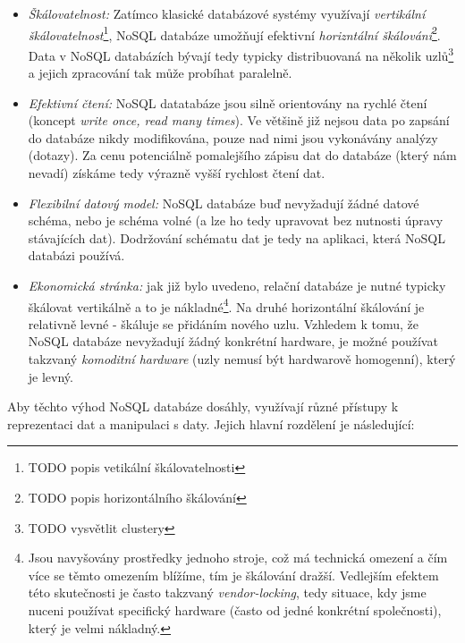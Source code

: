 \begin{itemize}
  \item{\textit{Škálovatelnost:}} Zatímco klasické databázové systémy využívají \textit{vertikální škálovatelnost}\footnote{TODO popis vetikální škálovatelnosti}, NoSQL databáze umožňují efektivní \textit{horizntální škálování}\footnote{TODO popis horizontálního škálování}. Data v NoSQL databázích bývají tedy typicky distribuovaná na několik uzlů\footnote{TODO vysvětlit clustery} a jejich zpracování tak může probíhat paralelně. 
  \item{\textit{Efektivní čtení:}} NoSQL datatabáze jsou silně orientovány na rychlé čtení (koncept \textit{write once, read many times}). Ve většině již nejsou data po zapsání do databáze nikdy modifikována, pouze nad nimi jsou vykonávány analýzy (dotazy). Za cenu potenciálně pomalejšího zápisu dat do databáze (který nám nevadí) získáme tedy výrazně vyšší rychlost čtení dat.  
  \item{\textit{Flexibilní datový model:}} NoSQL databáze buď nevyžadují žádné datové schéma, nebo je schéma volné (a lze ho tedy upravovat bez nutnosti úpravy stávajících dat). Dodržování schématu dat je tedy na aplikaci, která NoSQL databázi používá.  
  \item{\textit{Ekonomická stránka:}} jak již bylo uvedeno, relační databáze je nutné typicky škálovat vertikálně a to je nákladné\footnote{Jsou navyšovány prostředky jednoho stroje, což má technická omezení a čím více se těmto omezením blížíme, tím je škálování dražší. Vedlejším efektem této skutečnosti je často takzvaný \textit{vendor-locking}, tedy situace, kdy jsme nuceni používat specifický hardware (často od jedné konkrétní společnosti), který je velmi nákladný.}. Na druhé horizontální škálování je relativně levné - škáluje se přidáním nového uzlu. Vzhledem k tomu, že NoSQL databáze nevyžadují žádný konkrétní hardware, je možné používat takzvaný \textit{komoditní hardware} (uzly nemusí být hardwarově homogenní), který je levný.  
\end{itemize}

Aby těchto výhod NoSQL databáze dosáhly, využívají různé přístupy k reprezentaci dat a manipulaci s daty. Jejich hlavní rozdělení je následující: 

